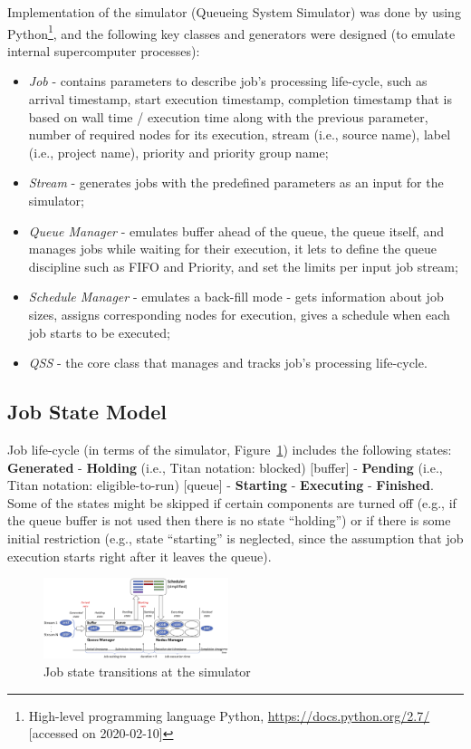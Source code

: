 Implementation of the simulator (Queueing System Simulator) \cite{ref-qss}
was done by using Python\footnote{High-level programming language Python,
\url{https://docs.python.org/2.7/} [accessed on 2020-02-10]}, and the
following key classes and generators were designed (to emulate internal
supercomputer processes):
\begin{itemize}
    \item \textit{Job} - contains parameters to describe job's processing
    life-cycle, such as arrival timestamp, start execution timestamp,
    completion timestamp that is based on wall time / execution time along
    with the previous parameter, number of required nodes for its execution,
    stream (i.e., source name), label (i.e., project name), priority and
    priority group name;
    \item \textit{Stream} - generates jobs with the predefined parameters as
    an input for the simulator;
    \item \textit{Queue Manager} - emulates buffer ahead of the queue, the
    queue itself, and manages jobs while waiting for their execution, it
    lets to define the queue discipline such as FIFO and Priority, and set
    the limits per input job stream;
    \item \textit{Schedule Manager} - emulates a back-fill mode - gets
    information about job sizes, assigns corresponding nodes for execution,
    gives a schedule when each job starts to be executed;
    \item \textit{QSS} - the core class that manages and tracks job's
    processing life-cycle.
\end{itemize}

\subsection{Job State Model} \label{appendix-simulator-description-2}

Job life-cycle (in terms of the simulator, Figure~\ref{fig-simulator-scheme})
includes the following states: \textbf{Generated} - \textbf{Holding} (i.e.,
Titan notation: blocked) [buffer] - \textbf{Pending} (i.e., Titan notation:
eligible-to-run) [queue] - \textbf{Starting} - \textbf{Executing} -
\textbf{Finished}.
Some of the states might be skipped if certain components are turned off (e.g.,
if the queue buffer is not used then there is no state ``holding'') or if there
is some initial restriction (e.g., state ``starting'' is neglected, since the
assumption that job execution starts right after it leaves the queue).

\begin{figure}
    \centering
    \includegraphics[width=0.48\textwidth]{pics/simulator-scheme.png}
    \caption{Job state transitions at the simulator}
    \label{fig-simulator-scheme}
\end{figure}
